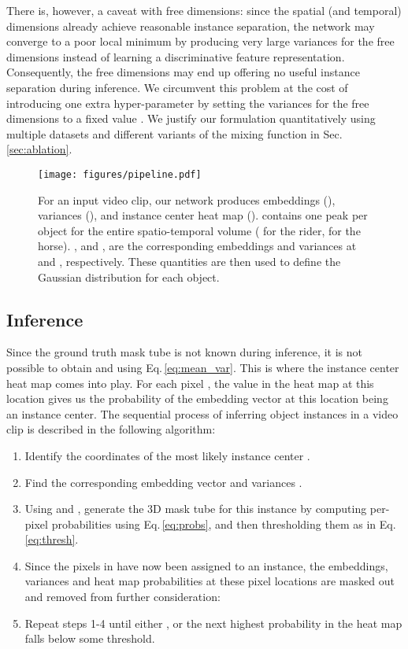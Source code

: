 \documentclass[runningheads]{llncs}
\newcommand{\refsec}[1]{Sec.\,\ref{sec:#1}}
\newcommand{\refequ}[1]{Eq.\,\ref{eq:#1}}
\begin{document}
There is, however, a caveat with free dimensions: since the spatial (and temporal) dimensions already achieve reasonable instance separation, the network may converge to a poor local minimum by producing very large variances for the free dimensions instead of learning a discriminative feature representation. Consequently, the free dimensions may end up offering no useful instance separation during inference. We circumvent this problem at the cost of introducing one extra hyper-parameter by setting the variances for the free dimensions to a fixed value .
We justify our formulation quantitatively using multiple datasets and different variants of the mixing function  in \refsec{ablation}.

\begin{figure}[t]
    \centering
    \texttt{[image: figures/pipeline.pdf]}
    \caption{For an input video clip, our network produces embeddings (), variances (), and instance center heat map ().  contains one peak per object for the entire spatio-temporal volume ( for the rider,  for the horse). ,  and ,  are the corresponding embeddings and variances at  and , respectively. These quantities are then used to define the Gaussian distribution for each object.}
    \label{fig:pipeline}
\end{figure}

\subsection{Inference}
\label{sec:inference}

Since the ground truth mask tube is not known during inference, it is not possible to obtain  and  using  \refequ{mean_var}. This is where the instance center heat map  comes into play. For each pixel , the value  in the heat map at this location gives us the probability of the embedding vector  at this location being an instance center. The sequential process of inferring object instances in a video clip is described in the following algorithm:

\begin{enumerate}
    \item Identify the coordinates of the most likely instance center .
\item Find the corresponding embedding vector  and variances .
\item Using  and , generate the 3D mask tube  for this instance by computing per-pixel probabilities using \refequ{probs}, and then thresholding them as in \refequ{thresh}.
\item Since the pixels in  have now been assigned to an instance, the embeddings, variances and heat map probabilities at these pixel locations are masked out and removed from further consideration:

    \item Repeat steps 1-4 until either , or the next highest probability in the heat map falls below some threshold.
\end{enumerate}
\end{document}

